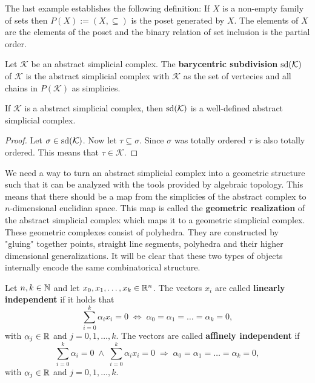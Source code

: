 The last example establishes the following definition:
If $X$ is a non-empty family of sets then $P(X) := (X, \subseteq)$ is the poset generated by $X$. The elements of $X$
are the elements of the poset and the binary relation of set inclusion is the partial order.

\begin{defin}
    Let $\mathcal{K}$ be an abstract simplicial complex. The \textbf{barycentric subdivision} ${\rm sd}(\mathcal{K})$ of $\mathcal{K}$
    is the abstract simplicial complex with $\mathcal{K}$ as the set of vertecies and all chains in $P(\mathcal{K})$ as simplicies.
\end{defin}

\begin{thm}
    If $\mathcal{K}$ is a abstract simplicial complex, then ${\rm sd}(\mathcal{K})$ is a well-defined abstract simplicial complex.
\end{thm}

\begin{proof}
    Let $\sigma \in {\rm sd}(\mathcal{K})$. Now let $\tau \subseteq \sigma$. Since $\sigma$ was totally ordered $\tau$ is also totally ordered.
    This means that $\tau \in \mathcal{K}$.
\end{proof}


We need a way to turn an abstract simplicial complex into a geometric structure such that it can be analyzed with the tools provided by algebraic topology. This means that there should be a map from the simplicies of the abstract complex to $n$-dimensional euclidian space. This map is called the \textbf{geometric realization} of the abstract simplicial complex which maps it to a geometric simplicial complex. 
These geometric complexes consist of polyhedra. They are constructed by "gluing" 
together points, straight line segments, polyhedra and their higher dimensional generalizations.
It will be clear that these two types of objects internally encode the same combinatorical structure. 

\begin{defin}
    Let $n,k \in \mathbb{N}$ and let $x_0, x_1, \ldots, x_k \in \mathbb{R}^n$. The vectors $x_i$ are called \textbf{linearly independent} if it holds that 
    \begin{equation*}
        \sum\limits_{i=0}^k \alpha_i x_i = 0 \; \iff \; \alpha_0 = \alpha_1 = \ldots = \alpha_k = 0,
    \end{equation*} with $\alpha_j \in \mathbb{R}$ and $j = 0, 1, \ldots, k$.
    The vectors are called \textbf{affinely independent} if
    \begin{equation*}
        \sum\limits_{i=0}^k \alpha_i = 0 \; \land \; \sum\limits_{i=0}^k \alpha_i x_i = 0 \; \Rightarrow \; \alpha_0 = \alpha_1 = \ldots = \alpha_k = 0, 
    \end{equation*} with $\alpha_j \in \mathbb{R}$ and $j = 0, 1, \ldots, k$.
\end{defin}

